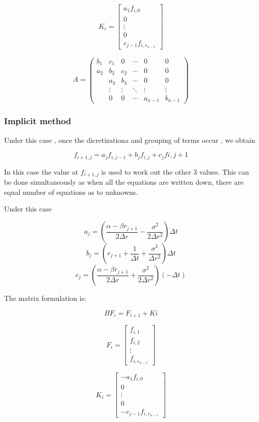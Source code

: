 \documentclass[12pt,a4paper]{article}
\begin{document}
$$K_{i}= \begin{bmatrix}
a_{1}f_{i,0} \\
0 \\
\vdots \\
0 \\
c_{j-1}f_{i, r_{n-1}}
\end{bmatrix}  $$


$$ A= \left( \begin{array}{cccccc}
b_{1} & c_{1} & 0 & \cdots  & 0 & 0\\
a_{2} & b_{2} & c_{2} &\cdots & 0 & 0 \\
& a_{3} & b_{3} & \cdots & 0 & 0  \\
& \vdots &\vdots & \ddots & \vdots & \vdots \\ 
& 0 & 0 & \cdots & a_{n-1} & b_{n-1} \end{array} \right) $$



\subsubsection{ Implicit method}

Under this case , once the dicretizationa and grouping of terms occur , we obtain

$$f_{i+1,j}= a_{j}f_{i,j-1}+b_{j}f_{i,j}+c_{j}f{i,j+1} $$

In this case the value at $f_{i+1,j}$ is used to work out the other 3 values. This can be done simultaneously as when all the equations are written down, there are equal number of equations as to unknowns.


Under this case

$$a_{j}= (\frac{\alpha-\beta r_{j+1}}{2\Delta r} - \frac{\sigma^2}{2\Delta r^2})\Delta t$$ 
$$b_{j}= (r_{j+1}+\frac{1}{\Delta t} + \frac{\sigma^2}{\Delta r ^2})\Delta t$$
$$c_{j}= (\frac{\alpha-\beta r_{j+1}}{2\Delta r} + \frac{\sigma^2}{2\Delta r^2})(-\Delta t) $$

The matrix formulation is:

$$ BF_{i}= F_{i+1}+K{i}$$


$$F_{i}= \begin{bmatrix}
f_{i,1} \\
f_{i,2} \\
\vdots \\
f_{i,r_{n-1}}
\end{bmatrix}
$$


$$K_{i}= \begin{bmatrix}
-a_{1}f_{i,0} \\
0 \\
\vdots \\
0 \\
-c_{j-1}f_{i, r_{n-1}}
\end{bmatrix}  $$
\end{document}
